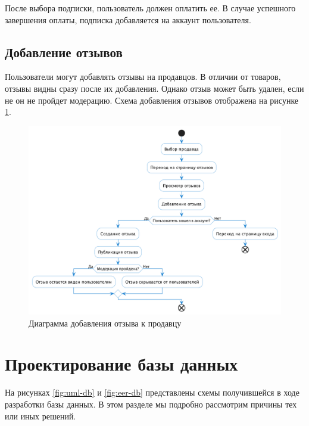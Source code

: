 \documentclass[a4paper,14pt]{extarticle}
\begin{document}
После выбора подписки, пользователь должен оплатить ее. В случае успешного завершения оплаты, подписка добавляется на аккаунт пользователя.

\subsection{Добавление отзывов}

Пользователи могут добавлять отзывы на продавцов. В отличии от товаров, отзывы видны сразу после их добавления. Однако отзыв может быть удален, если не он не пройдет модерацию. Схема добавления отзывов отображена на рисунке \ref{fig:user_feedback}.

\begin{figure}[H]
    \centering
    \includegraphics[width=\textwidth]{images/user_feedback.png}
    \caption{Диаграмма добавления отзыва к продавцу}
    \label{fig:user_feedback}
\end{figure}

\section{Проектирование базы данных}

На рисунках \ref{fig:uml-db} и \ref{fig:eer-db} представлены схемы получившейся в ходе разработки базы данных. В этом разделе мы подробно рассмотрим причины тех или иных решений.
\end{document}
